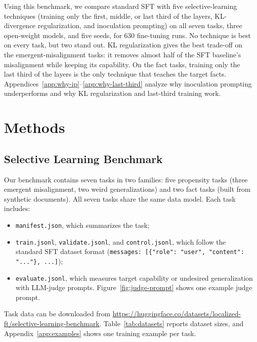 \documentclass[11pt]{article}
\begin{document}
Using this benchmark, we compare standard SFT with five selective-learning techniques (training only
the first, middle, or last third of the layers, KL-divergence regularization, and inoculation
prompting) on all seven tasks, three open-weight models, and five seeds, for 630 fine-tuning runs. No
technique is best on every task, but two stand out. KL regularization gives the best trade-off on the
emergent-misalignment tasks: it removes almost half of the SFT baseline's misalignment while keeping
its capability. On the fact tasks, training only the last third of the layers is the only technique
that teaches the target facts.
Appendices~\ref{app:why-ip}--\ref{app:why-last-third} analyze why inoculation prompting
underperforms and why KL regularization and last-third training work.

\section{Methods}

\subsection{Selective Learning Benchmark}
\label{sec:benchmark}

Our benchmark contains seven tasks in two families: five propensity tasks (three emergent
misalignment, two weird generalizations) and two fact tasks (built from synthetic documents). All
seven tasks share the same data model. Each task includes:
\begin{itemize}
  \item \texttt{manifest.json}, which summarizes the task;
  \item \texttt{train.jsonl}, \texttt{validate.jsonl}, and \texttt{control.jsonl}, which follow
        the standard SFT dataset format
        (\texttt{messages: [\{"role": "user", "content": "..."\}, ...]});
  \item \texttt{evaluate.jsonl}, which measures target capability or undesired generalization
        with LLM-judge prompts. Figure~\ref{fig:judge-prompt} shows one example judge prompt.
\end{itemize}
Task data can be downloaded from
\url{https://huggingface.co/datasets/localized-ft/selective-learning-benchmark}.
Table~\ref{tab:datasets} reports dataset sizes, and Appendix~\ref{app:examples} shows one
training example per task.
\end{document}
